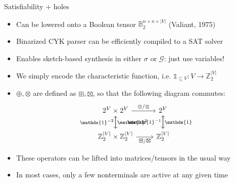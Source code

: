 \documentclass{beamer}
\begin{document}
\begin{frame}[fragile]{Satisfiability + holes}
  \begin{itemize}
    \item Can be lowered onto a Boolean tensor $\mathbb{B}_2^{n\times n \times |V|}$ (Valiant, 1975)
    \item Binarized CYK parser can be efficiently compiled to a SAT solver
    \item Enables sketch-based synthesis in either $\sigma$ or $\mathcal G$: just use variables!
    \item We simply encode the characteristic function, i.e. $\mathds{1}_{\subseteq V}: V\rightarrow \mathbb{Z}_2^{|V|}$
    \item $\oplus, \otimes$ are defined as $\boxplus, \boxtimes$, so that the following diagram commutes:
    \[\begin{tikzcd}
        2^V \times 2^V \arrow[r, "\oplus/\otimes"] \arrow[d, "\mathds{1}^2"]
        & 2^V \arrow[d, "\mathds{1}\phantom{^{-1}}"] \\
        \mathbb{Z}_2^{|V|} \times \mathbb{Z}_2^{|V|} \arrow[r, "\boxplus/\boxtimes", labels=below] \arrow[u, "\mathds{1}^{-2}"]
        & \mathbb{Z}_2^{|V|} \arrow[u, "\mathds{1}^{-1}"]
    \end{tikzcd}\]
    \item These operators can be lifted into matrices/tensors in the usual way
    \item In most cases, only a few nonterminals are active at any given time
  \end{itemize}
\end{frame}
\end{document}
